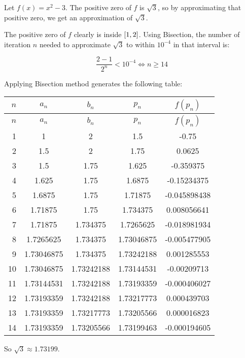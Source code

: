 \documentclass[../../../../Assignments.tex]{subfiles}
\begin{document}
\begin{solution}
    Let \(f(x) = x^2 - 3\). The positive zero of \(f\) is \(\sqrt{3}\), so by
    approximating that positive zero, we get an approximation of \(\sqrt{3}\).

    The positive zero of \(f\) clearly is inside \(\interval{1}{2}\). Using
    Bisection, the number of iteration \(n\) needed to approximate \(\sqrt{3}\)
    to within \(10^{-4}\) in that interval is:

    \[\frac{2 - 1}{2^n} < 10^{-4} \iff n \geq 14\]

    Applying Bisection method generates the following table:

    \begin{longtable}{r S[table-format=1.8] S[table-format=1.8] S[table-format=1.8] S[table-format=-1.9]}
        \toprule
        \(n\)  &   {\(a_n\)}   &   {\(b_n\)}   &   {\(p_n\)}   &  {\(f(p_n)\)}  \\
        \midrule
        \endfirsthead
        \(n\)  &   {\(a_n\)}   &   {\(b_n\)}   &   {\(p_n\)}   &  {\(f(p_n)\)}  \\
        \midrule
          &  1            &  2            &  1.5          &  -0.75         \\
            2  &  1.5          &  2            &  1.75         &   0.0625       \\
            3  &  1.5          &  1.75         &  1.625        &  -0.359375     \\
            4  &  1.625        &  1.75         &  1.6875       &  -0.15234375   \\
            5  &  1.6875       &  1.75         &  1.71875      &  -0.045898438  \\
            6  &  1.71875      &  1.75         &  1.734375     &   0.008056641  \\
            7  &  1.71875      &  1.734375     &  1.7265625    &  -0.018981934  \\
            8  &  1.7265625    &  1.734375     &  1.73046875   &  -0.005477905  \\
            9  &  1.73046875   &  1.734375     &  1.73242188   &   0.001285553  \\
           10  &  1.73046875   &  1.73242188   &  1.73144531   &  -0.00209713   \\
           11  &  1.73144531   &  1.73242188   &  1.73193359   &  -0.000406027  \\
           12  &  1.73193359   &  1.73242188   &  1.73217773   &   0.000439703  \\
           13  &  1.73193359   &  1.73217773   &  1.73205566   &   0.000016823  \\
           14  &  1.73193359   &  1.73205566   &  1.73199463   &  -0.000194605  \\
       \bottomrule
    \end{longtable}

    So \(\sqrt{3} \approx \num{1.73199}\).
\end{solution}
\end{document}
